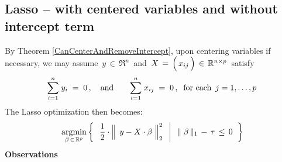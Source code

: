 \subsection{Lasso -- with centered variables and without intercept term}
\vskip 0.0cm
\noindent
By Theorem \ref{CanCenterAndRemoveIntercept}, upon centering variables if necessary,
we may assume \,$y \,\in\, \Re^{n}$\, and
\,$X \,=\, \left(\,\overset{{\color{white}-}}{x_{ij}}\,\right) \,\in\, \Re^{n \times p}$\,
satisfy
\begin{equation*}
\overset{n}{\underset{i=1}{\sum}}\;y_{i} \; = \; 0\,,
\quad\textnormal{and}\quad\quad
\overset{n}{\underset{i=1}{\sum}}\;x_{ij} \; = \; 0\,,
\;\;
\textnormal{for each \,$j = 1,\ldots,p$}
\end{equation*}
The Lasso optimization then becomes:
\begin{equation}
\label{PrimalLassoCenteredVariablesNoIntercept}
	\underset{\beta\,\in\,\Re^{p}}{\argmin}
	\left\{\;\;
		\left.
		\dfrac{1}{2}
		\cdot
		\left\Vert\;\, y \overset{{\color{white}.}}{-} X\cdot\beta \;\right\Vert_{2}^{2}
		\;\;\,\right\vert\;\;
		\Vert\;\beta\,\Vert_{1} \, - \, \tau \, \leq \, 0
		\;\;\right\}
\end{equation}
\textbf{Observations}
